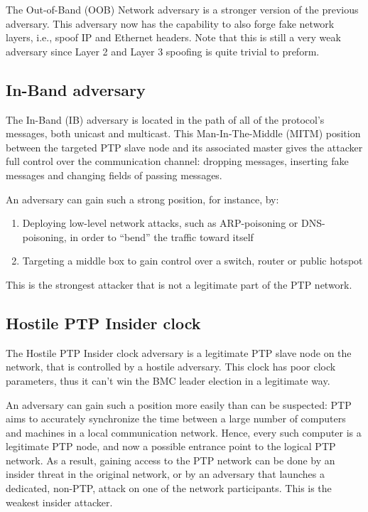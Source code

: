\documentclass[11pt]{article}
\begin{document}
The Out-of-Band (OOB) Network adversary is a stronger version of the previous adversary. This adversary now has the capability to also forge fake network layers, i.e., spoof IP and Ethernet headers. Note that this is still a very weak adversary since Layer 2 and Layer 3 spoofing is quite trivial to preform.



\subsection{In-Band adversary}\label{adv:IB}

The In-Band (IB) adversary is located in the path of all of the protocol's messages, both unicast and multicast. This Man-In-The-Middle (MITM) position between the targeted PTP slave node and its associated master gives the attacker full control over the communication channel: dropping messages, inserting fake messages and changing fields of passing messages.

An adversary can gain such a strong position, for instance, by:

\begin{enumerate}

  \item Deploying low-level network attacks, such as ARP-poisoning or DNS-poisoning, in order to ``bend'' the traffic toward itself

  \item Targeting a middle box to gain control over a switch, router or public hotspot

\end{enumerate}

This is the strongest attacker that is not a legitimate part of the PTP network.



\subsection{Hostile PTP Insider clock}\label{adv:slave}

The Hostile PTP Insider clock adversary is a legitimate PTP slave node on the network, that is controlled by a hostile adversary. This clock has poor clock parameters, thus it can't win the BMC leader election in a legitimate way.

An adversary can gain such a position more easily than can be suspected: PTP aims to accurately synchronize the time between a large number of computers and machines in a local communication network. Hence, every such computer is a legitimate PTP node, and now a possible entrance point to the logical PTP network. As a result, gaining access to the PTP network can be done by an insider threat in the original network, or by an adversary that launches a dedicated, non-PTP, attack on one of the network participants. This is the weakest insider attacker.
\end{document}
